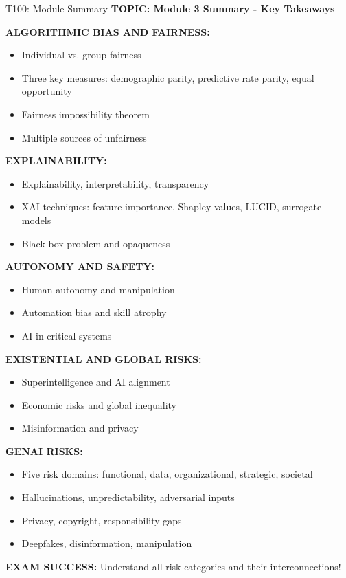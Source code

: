 \documentclass[8pt]{beamer}
\begin{document}
	\begin{frame}{T100: Module Summary}
		\fontsize{6.5}{7.5}\selectfont
		\textbf{TOPIC: Module 3 Summary - Key Takeaways}
		
		\vspace{0.1cm}
		\textbf{ALGORITHMIC BIAS AND FAIRNESS:}
		\begin{itemize}
			\item Individual vs. group fairness
			\item Three key measures: demographic parity, predictive rate parity, equal opportunity
			\item Fairness impossibility theorem
			\item Multiple sources of unfairness
		\end{itemize}
		
		\vspace{0.1cm}
		\textbf{EXPLAINABILITY:}
		\begin{itemize}
			\item Explainability, interpretability, transparency
			\item XAI techniques: feature importance, Shapley values, LUCID, surrogate models
			\item Black-box problem and opaqueness
		\end{itemize}
		
		\vspace{0.1cm}
		\textbf{AUTONOMY AND SAFETY:}
		\begin{itemize}
			\item Human autonomy and manipulation
			\item Automation bias and skill atrophy
			\item AI in critical systems
		\end{itemize}
		
		\vspace{0.1cm}
		\textbf{EXISTENTIAL AND GLOBAL RISKS:}
		\begin{itemize}
			\item Superintelligence and AI alignment
			\item Economic risks and global inequality
			\item Misinformation and privacy
		\end{itemize}
		
		\vspace{0.1cm}
		\textbf{GENAI RISKS:}
		\begin{itemize}
			\item Five risk domains: functional, data, organizational, strategic, societal
			\item Hallucinations, unpredictability, adversarial inputs
			\item Privacy, copyright, responsibility gaps
			\item Deepfakes, disinformation, manipulation
		\end{itemize}
		
		\textcolor{myred}{\textbf{EXAM SUCCESS:}} Understand all risk categories and their interconnections!
	\end{frame}
	
\end{document}

